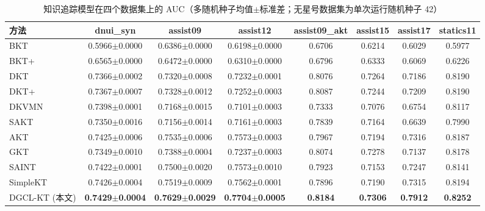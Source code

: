 \begin{table}[htbp]
\centering
\caption{知识追踪模型在四个数据集上的 AUC（多随机种子均值$\pm$标准差；无星号数据集为单次运行随机种子 42）}
\label{tab:kt-main}
\begin{tabular}{lccccccc}
\toprule
方法 & dnui_syn & assist09 & assist12 & assist09_akt & assist15 & assist17 & statics11 \\
\midrule
BKT & 0.5966$\pm$0.0000 & 0.6386$\pm$0.0000 & 0.6198$\pm$0.0000 & 0.6706 & 0.6214 & 0.6029 & 0.5977 \\
BKT+ & 0.6565$\pm$0.0000 & 0.6472$\pm$0.0000 & 0.6310$\pm$0.0000 & 0.6796 & 0.6333 & 0.6069 & 0.6226 \\
DKT & 0.7366$\pm$0.0002 & 0.7320$\pm$0.0008 & 0.7232$\pm$0.0001 & 0.8076 & 0.7264 & 0.7186 & 0.8190 \\
DKT+ & 0.7367$\pm$0.0007 & 0.7328$\pm$0.0012 & 0.7252$\pm$0.0003 & 0.8087 & 0.7244 & 0.7209 & 0.8190 \\
DKVMN & 0.7398$\pm$0.0001 & 0.7168$\pm$0.0015 & 0.7101$\pm$0.0003 & 0.7333 & 0.7076 & 0.6754 & 0.8117 \\
SAKT & 0.7350$\pm$0.0016 & 0.7156$\pm$0.0014 & 0.7161$\pm$0.0003 & 0.7839 & 0.7164 & 0.6639 & 0.7990 \\
AKT & 0.7425$\pm$0.0006 & 0.7535$\pm$0.0006 & 0.7573$\pm$0.0003 & 0.7967 & 0.7194 & 0.7316 & 0.8187 \\
GKT & 0.7349$\pm$0.0010 & 0.7388$\pm$0.0004 & 0.7237$\pm$0.0003 & 0.8074 & 0.7278 & 0.7137 & 0.8178 \\
SAINT & 0.7422$\pm$0.0001 & 0.7500$\pm$0.0020 & 0.7573$\pm$0.0010 & 0.7923 & 0.7153 & 0.7247 & 0.8141 \\
SimpleKT & 0.7426$\pm$0.0004 & 0.7519$\pm$0.0009 & 0.7562$\pm$0.0001 & 0.7896 & 0.7190 & 0.7315 & 0.8194 \\
DGCL-KT (本文) & \textbf{0.7429$\pm$0.0004} & \textbf{0.7629$\pm$0.0029} & \textbf{0.7704$\pm$0.0005} & \textbf{0.8184} & \textbf{0.7306} & \textbf{0.7912} & \textbf{0.8252} \\
\bottomrule
\end{tabular}
\end{table}